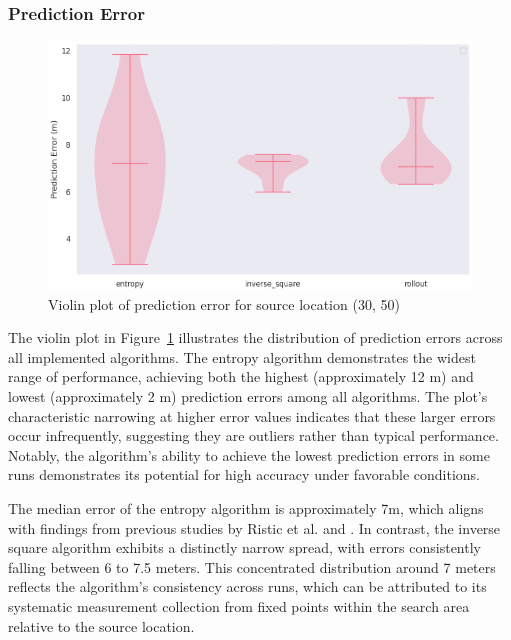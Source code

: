 \documentclass[../report.tex]{subfiles}
\begin{document}
    \subsubsection{Prediction Error}
    \begin{figure}[ht]
        \centering
        \includegraphics[width=\linewidth]{figures/prediction_violin_plot.png}
        \caption{Violin plot of prediction error for source location (30, 50)}
        \label{fig:prediction_violin_plot}
    \end{figure}

    The violin plot in Figure~\ref{fig:prediction_violin_plot} illustrates the distribution of prediction errors across all implemented algorithms. The entropy algorithm demonstrates the widest 
    range of performance, achieving both the highest (approximately 12 m) and lowest (approximately 2 m) prediction errors among all algorithms. The plot's characteristic narrowing at higher 
    error values indicates that these larger errors occur infrequently, suggesting they are outliers rather than typical performance. Notably, the algorithm's ability to achieve the lowest 
    prediction errors in some runs demonstrates its potential for high accuracy under favorable conditions.

    The median error of the entropy algorithm is approximately 7m, which aligns with findings from previous studies by Ristic et al. \cite{Ristic2007AnIG} and \cite{ristic2010information}. In 
    contrast, the inverse square algorithm exhibits a distinctly narrow spread, with errors consistently falling between 6 to 7.5 meters. This concentrated distribution around 7 meters reflects 
    the algorithm's consistency across runs, which can be attributed to its systematic measurement collection from fixed points within the search area relative to the source location.
\end{document}
